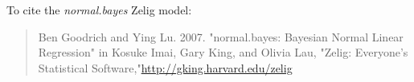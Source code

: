 To cite the \emph{ normal.bayes } Zelig model:
 \begin{verse}
 Ben Goodrich and Ying Lu. 2007. "normal.bayes: Bayesian Normal Linear Regression" in Kosuke Imai, Gary King, and Olivia Lau, "Zelig: Everyone's Statistical Software,"\url{http://gking.harvard.edu/zelig} 
\end{verse}
